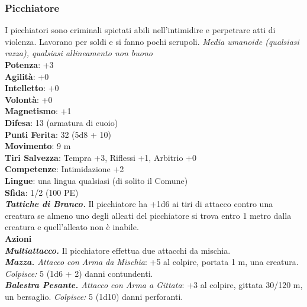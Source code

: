 \begin{multicols}{2}
\subsubsection{Picchiatore}
I picchiatori sono criminali spietati abili nell'intimidire e perpetrare atti di violenza. Lavorano per soldi e si fanno pochi scrupoli.
\emph{Media umanoide (qualsiasi razza), qualsiasi allineamento non buono}\\
\textbf{Potenza}: +3\\
\textbf{Agilità}: +0\\
\textbf{Intelletto}: +0\\
\textbf{Volontà}: +0\\
\textbf{Magnetismo}: +1\\
\textbf{Difesa}: 13 (armatura di cuoio)\\
\textbf{Punti Ferita}: 32 (5d8 + 10)\\
\textbf{Movimento}: 9 m\\
\textbf{Tiri Salvezza}: Tempra +3, Riflessi +1, Arbitrio +0 \\
\textbf{Competenze}: Intimidazione +2\\
\textbf{Lingue}: una lingua qualsiasi (di solito il Comune)\\
\textbf{Sfida}: 1/2 (100 PE)\smallskip\\
\emph{\textbf{Tattiche di Branco.}} Il picchiatore ha +1d6 ai tiri di attacco contro una creatura se almeno uno degli alleati del picchiatore si trova entro 1 metro dalla creatura e quell'alleato non è inabile.\\
\smallskip\textbf{Azioni} \\
\emph{\textbf{Multiattacco.}} Il picchiatore effettua due attacchi da mischia.\\
\emph{\textbf{Mazza.} Attacco con Arma da Mischia}: +5 al colpire, portata 1 m, una creatura.\\
\emph{Colpisce:} 5 (1d6 + 2) danni contundenti.\\
\emph{\textbf{Balestra Pesante.} Attacco con Arma a Gittata}: +3 al colpire, gittata 30/120 m, un bersaglio. \emph{Colpisce:} 5 (1d10) danni perforanti.\\


\end{multicols}
